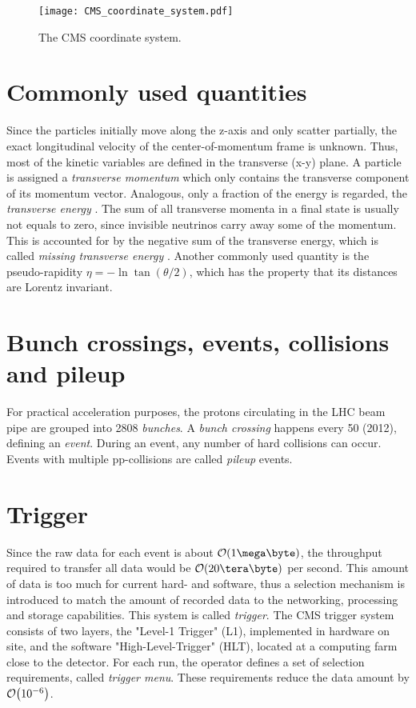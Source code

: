 \begin{figure}[htbp]
	\center
	\texttt{[image: CMS\_coordinate\_system.pdf]}
	\caption{The CMS coordinate system.}
	\label{fig:cms_coordinate_system}
\end{figure}

\section{Commonly used quantities}
Since the particles initially move along the z-axis and only scatter partially, the exact longitudinal velocity of the center-of-momentum frame is unknown. 
Thus, most of the kinetic variables are defined in the transverse (x-y) plane. A particle is assigned a \emph{transverse momentum} \pT which only contains the transverse component of its momentum vector. Analogous, only a fraction of the energy is regarded, the \emph{transverse energy} \ET. 
The sum of all transverse momenta in a final state is usually not equals to zero, since invisible neutrinos carry away some of the momentum. This is accounted for by the negative sum of the transverse energy, which is called \emph{missing transverse energy} \MET.
Another commonly used quantity is the pseudo-rapidity $\eta = -\ln \tan(\theta/2)$, which has the property that its distances are Lorentz invariant.

\section{Bunch crossings, events, collisions and pileup}
For practical acceleration purposes, the protons circulating in the LHC beam pipe are grouped into 2808 \emph{bunches}\cite[p.4]{EB2008LHC}. A \emph{bunch crossing} happens every \unit{50}{\nano\second} (2012), defining an \emph{event}. During an event, any number of hard collisions can occur. Events with multiple pp-collisions are called \emph{pileup} events.

\section{Trigger}
Since the raw data for each event is about $\order{\unit{1}{\mega\byte}}$, the throughput required to transfer all data would be $\order{\unit{20}{\tera\byte}}$ per second. This amount of data is too much for current hard- and software, thus a selection mechanism is introduced to match the amount of recorded data to the networking, processing and storage capabilities. This system is called \emph{trigger}. The CMS trigger system consists of two layers, the "Level-1 Trigger" (L1), implemented in hardware on site, and the software "High-Level-Trigger" (HLT), located at a computing farm close to the detector. For each run, the operator defines a set of selection requirements, called \emph{trigger menu}. These requirements reduce the data amount by $\order{10^{-6}}$.

